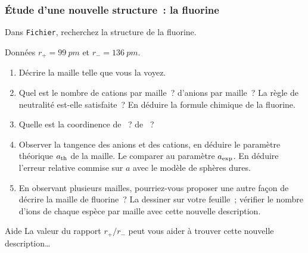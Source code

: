 \documentclass[a4paper, 10pt, final, garamond]{book}
\begin{document}

\subsubsection{Étude d'une nouvelle structure~: la fluorine}
\label{sssec:flu}
Dans \texttt{Fichier}, recherchez la structure de la fluorine.
\begin{rdefi}{Données}
  $r_{+} = \SI{99}{pm}$ et $r_{-} = \SI{136}{pm}$.
\end{rdefi}

\begin{enumerate}[label=\sqenumi, start=27]
  \item Décrire la maille telle que vous la voyez.
  \item Quel est le nombre de cations par maille~? d'anions par maille~? La
    règle de neutralité est-elle satisfaite~? En déduire la formule chimique de
    la fluorine.
  \item Quelle est la coordinence de ~? de ~?
  \item Observer la tangence des anions et des cations, en déduire le paramètre
    théorique $a_{\rm th}$ de la maille. Le comparer au paramètre $a_{\rm exp}$.
    En déduire l'erreur relative commise sur $a$ avec le modèle de sphères
    dures.
  \item En observant plusieurs mailles, pourriez-vous proposer une autre façon
    de décrire la maille de fluorine~? La dessiner sur votre feuille~; vérifier
    le nombre d'ions de chaque espèce par maille avec cette nouvelle
    description.
\end{enumerate}
\begin{instruc}[tikz={rotate=180, transform shape}]{Aide}
  La valeur du rapport $r_{+}/r_{-}$ peut vous aider à trouver cette nouvelle
  description…
\end{instruc}
\end{document}
